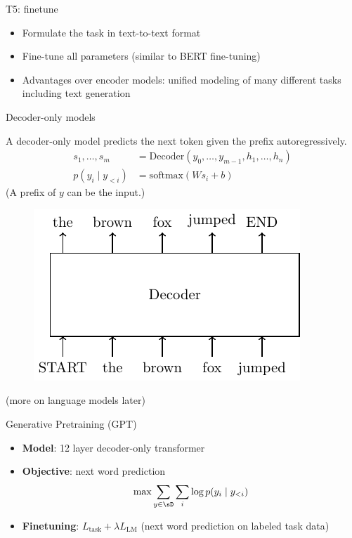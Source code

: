 \documentclass[usenames,dvipsnames,notes,11pt,aspectratio=169,hyperref={colorlinks=true, linkcolor=blue}]{beamer}
\begin{document}
\begin{frame}
    {T5: finetune}
    \begin{itemize}
        \item Formulate the task in text-to-text format
        \item Fine-tune all parameters (similar to BERT fine-tuning)
        \item Advantages over encoder models: unified modeling of many different tasks including text generation
    \end{itemize}
\end{frame}

\begin{frame}
    {Decoder-only models}

    A decoder-only model predicts the next token given the prefix autoregressively.
    \begin{align*}
        s_1,\ldots,s_m &= \mathrm{Decoder}(y_0,\ldots,y_{m-1}, h_1,\ldots,h_n)\\
        p(y_i\mid y_{<i}) &= \mathrm{softmax}(Ws_i+b)
    \end{align*}
    (A prefix of $y$ can be the input.)
    \begin{figure}
            \includegraphics[height=0.5\textheight]{figures/decoder}
    \end{figure}
    (more on language models later)
\end{frame}

\begin{frame}
    {Generative Pretraining (GPT)}
    \begin{itemize}
        \item {\bf Model}: 12 layer decoder-only transformer
        \item {\bf Objective}: next word prediction
            $$
            \max \sum_{y\in\sD} \sum_i \log p(y_i\mid y_{<i})
            $$
        \item {\bf Finetuning}:  $L_{\text{task}} + \lambda L_{\text{LM}}$ (next word prediction on labeled task data)
    \end{itemize}
\end{frame}
\end{document}
